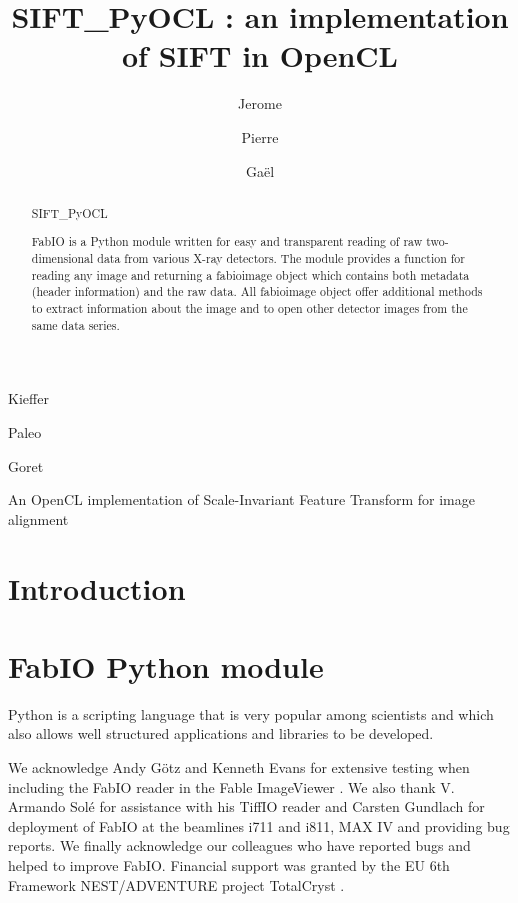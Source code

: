 \documentclass[preprint]{iucr}
\begin{document}
\title{SIFT\_PyOCL : an implementation of SIFT in OpenCL}

    \author[a]{Jerome}{Kieffer}
    \author[b]{Pierre}{Paleo}
    \author[c]{Ga\"el}{Goret}

\maketitle

\begin{synopsis}
An OpenCL implementation of Scale-Invariant Feature Transform for image alignment
\end{synopsis}

\begin{abstract}
SIFT\_PyOCL 


FabIO is a Python module written for easy and transparent reading 
of raw two-dimensional data from various X-ray detectors. The module provides a
function for reading any image and returning a fabioimage object which 
contains both metadata (header information) and the raw data.
All fabioimage object offer additional methods to extract
information about the image and to open other detector images from
the same data series.
 
\end{abstract}

\section{Introduction}


\section{FabIO Python module}

Python \cite{python} is a scripting language that is very popular among scientists
and which also allows well structured applications and libraries to be developed.





We acknowledge Andy G\"otz and Kenneth Evans for extensive testing when including
the FabIO reader in the Fable ImageViewer \cite{fable}.
We also thank V. Armando Sol\'e for assistance with his TiffIO reader and
Carsten Gundlach for deployment of FabIO at the beamlines i711 and i811, 
MAX IV and providing bug reports.
We finally acknowledge our colleagues who have reported bugs and helped to
improve FabIO.
Financial support was granted by the EU 6th Framework NEST/ADVENTURE project
TotalCryst \cite{totalcryst}.





\end{document}
